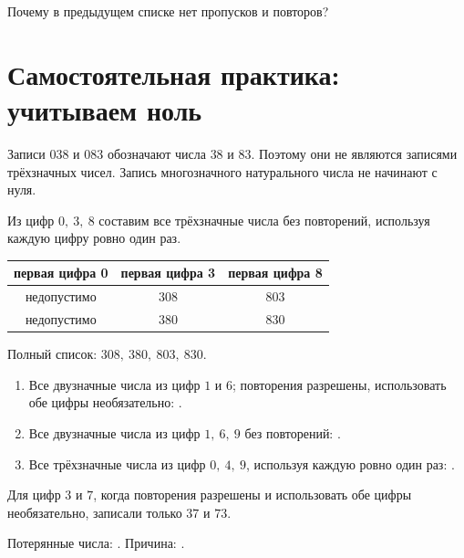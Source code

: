 \begin{practicebox}
  Почему в предыдущем списке нет пропусков и повторов?
\end{practicebox}

\newpage
\section{Самостоятельная практика: учитываем ноль}

\begin{warningbox}
  Записи \(038\) и \(083\) обозначают числа \(38\) и \(83\). Поэтому они не
  являются записями трёхзначных чисел. Запись многозначного натурального числа
  не начинают с нуля.
\end{warningbox}

\begin{problembox}[Пример]
  Из цифр \(0,\ 3,\ 8\) составим все трёхзначные числа без повторений,
  используя каждую цифру ровно один раз.
  \begin{center}
  \renewcommand{\arraystretch}{1.45}
  \begin{tabular}{c|c|c}
    \toprule
    первая цифра 0 & первая цифра 3 & первая цифра 8 \\
    \midrule
    недопустимо & \(308\) & \(803\) \\
    недопустимо & \(380\) & \(830\) \\
    \bottomrule
  \end{tabular}
  \end{center}
  Полный список: \(308,\ 380,\ 803,\ 830\).
\end{problembox}

\begin{practicebox}
  \begin{enumerate}[label=\textbf{\arabic*.}]
    \item Все двузначные числа из цифр \(1\) и \(6\); повторения разрешены,
      использовать обе цифры необязательно: \answerblank[72mm].
    \item Все двузначные числа из цифр \(1,\ 6,\ 9\) без повторений:
      \answerblank[86mm].
    \item Все трёхзначные числа из цифр \(0,\ 4,\ 9\), используя каждую ровно
      один раз: \answerblank[86mm].
  \end{enumerate}
\end{practicebox}

\begin{warningbox}
  Для цифр \(3\) и \(7\), когда повторения разрешены и использовать обе цифры
  необязательно, записали только \(37\) и \(73\).

  Потерянные числа: \answerblank[42mm].
  Причина: \answerblank[74mm].
\end{warningbox}

